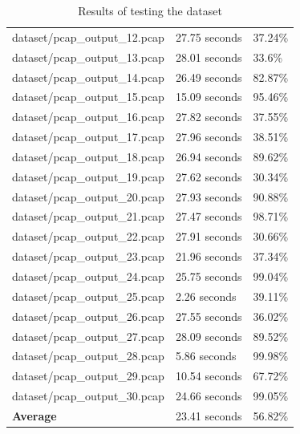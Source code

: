 \documentclass[
  printed,     %
  color,       %
  oneside,     %
  nosansbold,  %
  nocolorbold, %
  nolof,         %
  nolot,         %
]{fithesis4}
\begin{document}
\begin{table}[]
\begin{tabular}{lll}
\multicolumn{1}{l|}{dataset/pcap\_output\_12.pcap} & \multicolumn{1}{l|}{27.75 seconds} & 37.24\%         \\
\multicolumn{1}{l|}{dataset/pcap\_output\_13.pcap} & \multicolumn{1}{l|}{28.01 seconds} & 33.6\%         \\
\multicolumn{1}{l|}{dataset/pcap\_output\_14.pcap} & \multicolumn{1}{l|}{26.49 seconds} & 82.87\%         \\
\multicolumn{1}{l|}{dataset/pcap\_output\_15.pcap} & \multicolumn{1}{l|}{15.09 seconds} & 95.46\%         \\
\multicolumn{1}{l|}{dataset/pcap\_output\_16.pcap} & \multicolumn{1}{l|}{27.82 seconds} & 37.55\%         \\
\multicolumn{1}{l|}{dataset/pcap\_output\_17.pcap} & \multicolumn{1}{l|}{27.96 seconds} & 38.51\%         \\
\multicolumn{1}{l|}{dataset/pcap\_output\_18.pcap} & \multicolumn{1}{l|}{26.94 seconds} & 89.62\%         \\
\multicolumn{1}{l|}{dataset/pcap\_output\_19.pcap} & \multicolumn{1}{l|}{27.62 seconds} & 30.34\%         \\
\multicolumn{1}{l|}{dataset/pcap\_output\_20.pcap} & \multicolumn{1}{l|}{27.93 seconds} & 90.88\%         \\
\multicolumn{1}{l|}{dataset/pcap\_output\_21.pcap} & \multicolumn{1}{l|}{27.47 seconds} & 98.71\%         \\
\multicolumn{1}{l|}{dataset/pcap\_output\_22.pcap} & \multicolumn{1}{l|}{27.91 seconds} & 30.66\%         \\
\multicolumn{1}{l|}{dataset/pcap\_output\_23.pcap} & \multicolumn{1}{l|}{21.96 seconds} & 37.34\%         \\
\multicolumn{1}{l|}{dataset/pcap\_output\_24.pcap} & \multicolumn{1}{l|}{25.75 seconds} & 99.04\%         \\
\multicolumn{1}{l|}{dataset/pcap\_output\_25.pcap} & \multicolumn{1}{l|}{2.26 seconds} & 39.11\%         \\
\multicolumn{1}{l|}{dataset/pcap\_output\_26.pcap} & \multicolumn{1}{l|}{27.55 seconds} & 36.02\%         \\
\multicolumn{1}{l|}{dataset/pcap\_output\_27.pcap} & \multicolumn{1}{l|}{28.09 seconds} & 89.52\%         \\
\multicolumn{1}{l|}{dataset/pcap\_output\_28.pcap} & \multicolumn{1}{l|}{5.86 seconds} & 99.98\%         \\
\multicolumn{1}{l|}{dataset/pcap\_output\_29.pcap} & \multicolumn{1}{l|}{10.54 seconds} & 67.72\%         \\
\multicolumn{1}{l|}{dataset/pcap\_output\_30.pcap} & \multicolumn{1}{l|}{24.66 seconds} & 99.05\%         \\ \hline
\textbf{Average}                                   & 23.41 seconds                      & 56.82\%        
\end{tabular}
\caption{\label{tab:res}Results of testing the dataset}
\end{table}
\end{document}
